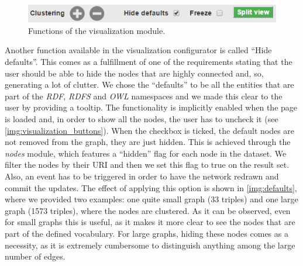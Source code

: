 \begin{figure}[htb]
	\centering
	\vspace{.5cm}
  	\centerline{\includegraphics[width=0.95\linewidth]{img/visualization_buttons.png}}
	\caption{Functions of the visualization module.}
	\label{img:visualization_buttons}
\end{figure}

Another function available in the visualization configurator is called ``Hide defaults''. This comes as a fulfillment of one of the requirements stating that the user should be able to hide the nodes that are highly connected and, so, generating a lot of clutter. We chose the ``defaults'' to be all the entities that are part of the \textit{RDF}, \textit{RDFS} and \textit{OWL} namespaces and we made this clear to the user by providing a tooltip. The functionality is implicitly enabled when the page is loaded and, in order to show all the nodes, the user has to uncheck it (see \autoref{img:visualization_buttons}). When the checkbox is ticked, the default nodes are not removed from the graph, they are just hidden. This is achieved through the \textit{nodes} module, which features a ``hidden'' flag for each node in the dataset. We filter the nodes by their URI and then we set this flag to true on the result set. Also, an event has to be triggered in order to have the network redrawn and commit the updates. The effect of applying this option is shown in \autoref{img:defaults}, where we provided two examples: one quite small graph (33 triples) and one large graph (1573 triples), where the nodes are clustered. As it can be observed, even for small graphs this is useful, as it makes it more clear to see the nodes that are part of the defined vocabulary. For large graphs, hiding these nodes comes as a necessity, as it is extremely cumbersome to distinguish anything among the large number of edges.

